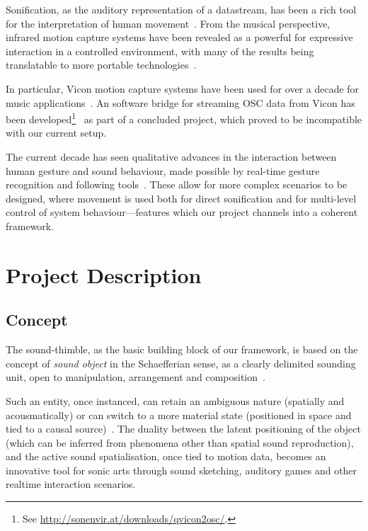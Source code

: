 \documentclass{nime-alternate}
\begin{document}
Sonification, as the auditory representation of a datastream, has been a rich tool for the interpretation of human movement~\cite{hermann2011sonification}. From the musical perspective, infrared motion capture systems have been revealed as a powerful for expressive interaction in a controlled environment, with many of the results being translatable to more portable technologies~\cite{skogstad2010using,vigliensoni2012quantitative}.

In particular, Vicon motion capture systems have been used for over a decade for music applications~\cite{dobrian2003gestural,kapur2005framework,eckel2009motion,vigliensoni2012quantitative}. An software bridge for streaming OSC data from Vicon has been developed\footnote{See \url{http://sonenvir.at/downloads/qvicon2osc/}.}~\cite{eckel2009motion} as part of a concluded project, which proved to be incompatible with our current setup.

The current decade has seen qualitative advances in the interaction between human gesture and sound behaviour, made possible by real-time gesture recognition and following tools~\cite{probabilisticmodels}. These allow for more complex scenarios to be designed, where movement is used both for direct sonification and for multi-level control of system behaviour---features which our project channels into a coherent framework.


\section{Project Description}
\label{sec:proj}

\subsection{Concept}


The sound-thimble, as the basic building block of our framework, is based on the concept of \textit{sound object} in the Schaefferian sense, as a clearly delimited sounding unit, open to manipulation, arrangement and composition~\cite{schaeffer1998solfege}.

Such an entity, once instanced, can retain an ambiguous nature (spatially and acousmatically) or can switch to a more material state (positioned in space and tied to a causal source)~\cite{soundunseen}. The duality between the latent positioning of the object (which can be inferred from phenomena other than spatial sound reproduction), and the active sound spatialisation, once tied to motion data, becomes an innovative tool for sonic arts through sound sketching, auditory games and other realtime interaction scenarios.
\end{document}
